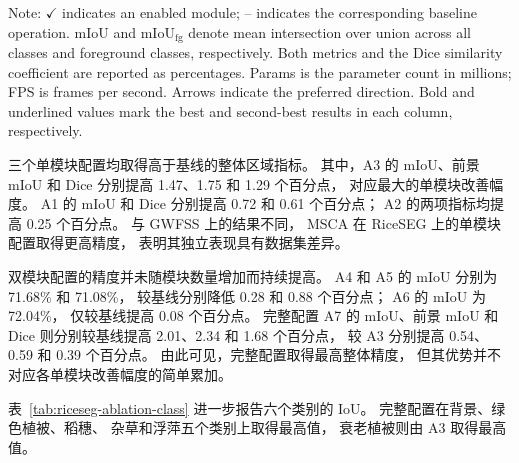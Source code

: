 \begin{table}[!htb]
\begin{minipage}{\linewidth}
    \vspace{2pt}
    \noindent Note: \(\checkmark\) indicates an enabled module; -- indicates the corresponding baseline operation. mIoU and \(\mathrm{mIoU}_{\mathrm{fg}}\) denote mean intersection over union across all classes and foreground classes, respectively. Both metrics and the Dice similarity coefficient are reported as percentages. Params is the parameter count in millions; FPS is frames per second. Arrows indicate the preferred direction. Bold and underlined values mark the best and second-best results in each column, respectively.\par
  \end{minipage}\par
\end{table}

三个单模块配置均取得高于基线的整体区域指标。
其中，A3 的 mIoU、前景 mIoU 和 Dice
分别提高 1.47、1.75 和 1.29 个百分点，
对应最大的单模块改善幅度。
A1 的 mIoU 和 Dice
分别提高 0.72 和 0.61 个百分点；
A2 的两项指标均提高 0.25 个百分点。
与 GWFSS 上的结果不同，
MSCA 在 RiceSEG 上的单模块配置取得更高精度，
表明其独立表现具有数据集差异。

双模块配置的精度并未随模块数量增加而持续提高。
A4 和 A5 的 mIoU 分别为 71.68\% 和 71.08\%，
较基线分别降低 0.28 和 0.88 个百分点；
A6 的 mIoU 为 72.04\%，
仅较基线提高 0.08 个百分点。
完整配置 A7 的 mIoU、前景 mIoU 和 Dice
则分别较基线提高 2.01、2.34 和 1.68 个百分点，
较 A3 分别提高 0.54、0.59 和 0.39 个百分点。
由此可见，完整配置取得最高整体精度，
但其优势并不对应各单模块改善幅度的简单累加。

表~\ref{tab:riceseg-ablation-class}
进一步报告六个类别的 IoU。
完整配置在背景、绿色植被、稻穗、
杂草和浮萍五个类别上取得最高值，
衰老植被则由 A3 取得最高值。

